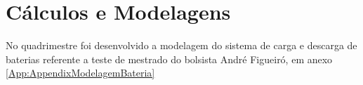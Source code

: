 
\setcounter{secnumdepth}{3}
\section{Cálculos e Modelagens}
\label{calculos_e_modelagens}

No quadrimestre foi desenvolvido a modelagem do sistema de carga e descarga de baterias referente a teste de mestrado do bolsista André Figueiró, em anexo \ref{App:AppendixModelagemBateria}  
